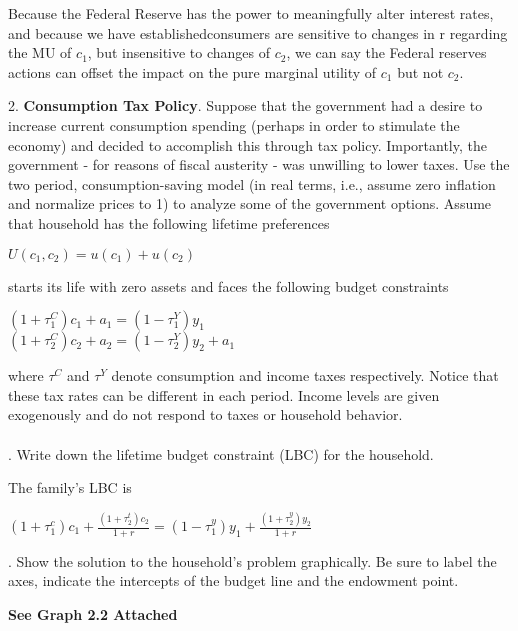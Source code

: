 \documentclass[11pt]{SelfArxOneColBMN}
\begin{document}
\begin{solution}
  Because the Federal Reserve has the power to meaningfully alter interest rates, and because we have establishedconsumers are sensitive to changes in r regarding the MU of $c_1$, but insensitive to changes of $c_2$, we can say the Federal reserves actions can offset the impact on the pure marginal utility of $c_1$ but not $c_2$. 
\end{solution}
2. \textbf{Consumption Tax Policy}. Suppose that the government had a desire to increase current consumption spending (perhaps in order to stimulate the economy) and decided to accomplish this through tax policy. Importantly, the government - for reasons of fiscal austerity - was unwilling to lower taxes. Use the two period, consumption-saving model (in real terms, i.e., assume zero inflation and normalize prices to 1) to analyze some of the government options. Assume that household has the following lifetime preferences
\begin{center}
	$U(c_1,c_2) = u(c_1) + u(c_2)$
\end{center}
starts its life with zero assets and faces the following budget constraints
\begin{center}
	$(1 + \tau_1^C)c_1 + a_1 = (1 - \tau_1^Y)y_1$\\
	$(1 + \tau_2^C)c_2 + a_2 = (1 - \tau_2^Y)y_2 + a_1$
\end{center}
where $\tau^C$ and $\tau^Y$ denote consumption and income taxes respectively. Notice that these tax rates can be different in each period. Income levels are given exogenously and do not respond to taxes or household behavior.\\
\\
. Write down the lifetime budget constraint (LBC) for the household.\\
\begin{solution}
The family's LBC is
  \begin{center}
    $(1 + \tau_1^c)c_1 + \frac{(1 + \tau_2^t)c_2}{1 + r} = (1 - \tau_1^y)y_1 + \frac{(1 + \tau_2^y)y_2}{1 + r}$
  \end{center}
\end{solution}
. Show the solution to the household's problem graphically. Be sure to label the axes, indicate the intercepts of the budget line and the endowment point.\\
\begin{solution}
  \begin{center}
    \textbf{See Graph 2.2 Attached}
  \end{center}
\end{solution}
\end{document}
